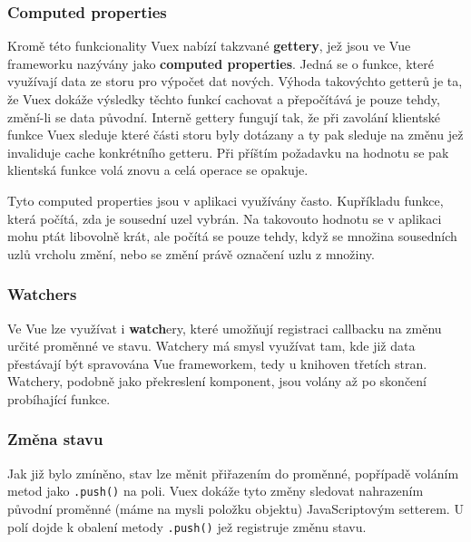 \subsubsection{Computed properties}

Kromě této funkcionality Vuex nabízí takzvané \textbf{gettery}, jež jsou ve Vue frameworku nazývány jako \textbf{computed properties}. Jedná se o funkce, které využívají data ze storu pro výpočet dat nových. Výhoda takovýchto getterů je ta, že Vuex dokáže výsledky těchto funkcí cachovat a přepočítává je pouze tehdy, změní-li se data původní. Interně gettery fungují tak, že při zavolání klientské funkce Vuex sleduje které části storu byly dotázany a ty pak sleduje na změnu jež invaliduje cache konkrétního getteru. Při příštím požadavku na hodnotu se pak klientská funkce volá znovu a celá operace se opakuje.

Tyto computed properties jsou v aplikaci využívány často. Kupříkladu funkce, která počítá, zda je sousední uzel vybrán. Na takovouto hodnotu se v aplikaci mohu ptát libovolně krát, ale počítá se pouze tehdy, když se množina sousedních uzlů vrcholu změní, nebo se změní právě označení uzlu z množiny.

\subsubsection{Watchers}

Ve Vue lze využívat i \textbf{watch}ery, které umožňují registraci callbacku na změnu určité proměnné ve stavu. Watchery má smysl využívat tam, kde již data přestávají být spravována Vue frameworkem, tedy u knihoven třetích stran. Watchery, podobně jako překreslení komponent, jsou volány až po skončení probíhající funkce.

\subsubsection{Změna stavu}

Jak již bylo zmíněno, stav lze měnit přiřazením do proměnné, popřípadě voláním metod jako \texttt{.push()} na poli. Vuex dokáže tyto změny sledovat nahrazením původní proměnné (máme na mysli položku objektu) JavaScriptovým setterem. U polí dojde k obalení metody \texttt{.push()} jež registruje změnu stavu.

